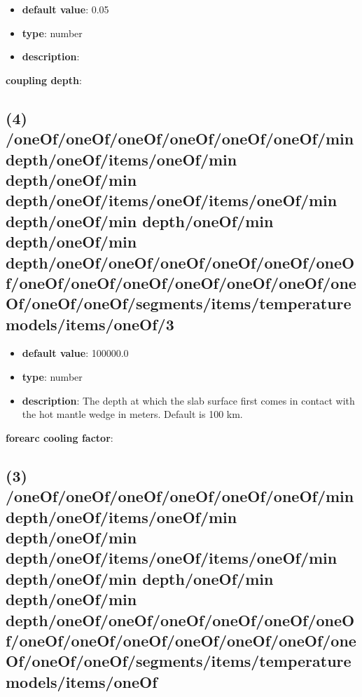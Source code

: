 \begin{itemize}[leftmargin=8em]\item {\bf default value}: 0.05
\item {\bf type}: number
\item {\bf description}: 
\end{itemize}\item {\bf coupling depth}: \subsection{(4) /oneOf/oneOf/oneOf/oneOf/oneOf/oneOf/min depth/oneOf/items/oneOf/min depth/oneOf/min depth/oneOf/items/oneOf/items/oneOf/min depth/oneOf/min depth/oneOf/min depth/oneOf/min depth/oneOf/oneOf/oneOf/oneOf/oneOf/oneOf/oneOf/oneOf/oneOf/oneOf/oneOf/oneOf/oneOf/oneOf/oneOf/segments/items/temperature models/items/oneOf/3}
\begin{itemize}[leftmargin=4em]\item {\bf default value}: 100000.0
\item {\bf type}: number
\item {\bf description}: The depth at which the slab surface first comes in contact with the hot mantle wedge in meters. Default is 100 km.
\end{itemize}\item {\bf forearc cooling factor}: \subsection{(3) /oneOf/oneOf/oneOf/oneOf/oneOf/oneOf/min depth/oneOf/items/oneOf/min depth/oneOf/min depth/oneOf/items/oneOf/items/oneOf/min depth/oneOf/min depth/oneOf/min depth/oneOf/min depth/oneOf/oneOf/oneOf/oneOf/oneOf/oneOf/oneOf/oneOf/oneOf/oneOf/oneOf/oneOf/oneOf/oneOf/oneOf/segments/items/temperature models/items/oneOf}
